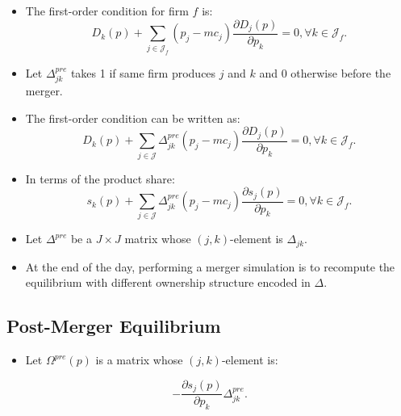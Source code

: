 \documentclass[
]{book}
\providecommand{\tightlist}{%
  \setlength{\itemsep}{0pt}\setlength{\parskip}{0pt}}
\begin{document}
\begin{itemize}
\tightlist
\item
  The first-order condition for firm \(f\) is:
  \begin{equation}
  D_k(p) + \sum_{j \in \mathcal{J}_f} (p_j - mc_j) \frac{\partial D_j(p)}{\partial p_k} = 0, \forall k \in \mathcal{J}_f.
  \end{equation}
\item
  Let \(\Delta_{jk}^{pre}\) takes 1 if same firm produces \(j\) and \(k\) and 0 otherwise before the merger.
\item
  The first-order condition can be written as:
  \begin{equation}
  D_k(p) + \sum_{j \in \mathcal{J}} \Delta_{jk}^{pre}(p_j - mc_j) \frac{\partial D_j(p)}{\partial p_k} = 0, \forall k \in \mathcal{J}_f.
  \end{equation}
\item
  In terms of the product share:
  \begin{equation}
  s_k(p) + \sum_{j \in \mathcal{J}} \Delta_{jk}^{pre}(p_j - mc_j) \frac{\partial s_j(p)}{\partial p_k} = 0, \forall k \in \mathcal{J}_f.
  \end{equation}
\item
  Let \(\Delta^{pre}\) be a \(J \times J\) matrix whose \((j, k)\)-element is \(\Delta_{jk}\).
\item
  At the end of the day, performing a merger simulation is to recompute the equilibrium with different ownership structure encoded in \(\Delta\).
\end{itemize}

\hypertarget{post-merger-equilibrium}{%
\subsection{Post-Merger Equilibrium}\label{post-merger-equilibrium}}

\begin{itemize}
\tightlist
\item
  Let \(\Omega^{pre}(p)\) is a matrix whose \((j, k)\)-element is:
\end{itemize}

\begin{equation}
- \frac{\partial s_{j}(p)}{\partial p_k} \Delta_{jk}^{pre}.
\end{equation}
\end{document}
